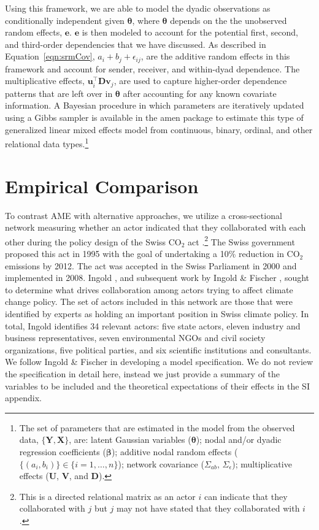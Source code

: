 \documentclass[9pt,twocolumn,twoside,lineno]{pnas-new}
\newcommand{\pkg}[1]{{\fontseries{b}\selectfont #1}}
\begin{document}
Using this framework, we are able to model the dyadic observations as conditionally independent given $\bm\theta$, where $\bm\theta$ depends on the the unobserved random effects, $\mathbf{e}$. $\mathbf{e}$ is then modeled to account for the potential first, second, and third-order dependencies that we have discussed. As described in Equation~\ref{eqn:srmCov}, $a_{i} + b_{j}  + \epsilon_{ij}$, are the additive random effects in this framework and account for sender, receiver, and within-dyad dependence. The multiplicative effects, $\textbf{u}_{i}^{\top} \textbf{D} \textbf{v}_{j}$, are used to capture higher-order dependence patterns that are left over in $\bm\theta$ after accounting for any known covariate information. A Bayesian procedure in which parameters are iteratively updated using a Gibbs sampler is available in the \pkg{amen} package to estimate this type of generalized linear mixed effects model from continuous, binary, ordinal, and other relational data types.\footnote{The set of parameters that are estimated in the model from the observed data, $\{\mathbf{Y}, \mathbf{X}\}$, are: latent Gaussian variables ($\bm\theta$); nodal and/or dyadic regression coefficients ($\bm\beta$); additive nodal random effects ($\{(a_{i},b_{i})\} \in \{i=1, \ldots, n \}$); network covariance ($\Sigma_{ab},\, \Sigma_{\epsilon}$); multiplicative effects ($\mathbf{U}$, $\mathbf{V}$, and $\mathbf{D}$).}

\section*{\textbf{Empirical Comparison}}

To contrast AME with alternative approaches, we utilize a cross-sectional network measuring whether an actor indicated that they collaborated with each other during the policy design of the Swiss CO$_{2}$ act \citep{ingold:2008}.\footnote{This is a directed relational matrix as an actor $i$ can indicate that they collaborated with $j$ but $j$ may not have stated that they collaborated with $i$.} The Swiss government proposed this act in 1995 with the goal of undertaking a 10\% reduction in CO$_{2}$ emissions by 2012. The act was accepted in the Swiss Parliament in 2000 and implemented in 2008. Ingold \cite{ingold:2008}, and subsequent work by Ingold \& Fischer \cite{ingold:fischer:2014}, sought to determine what drives collaboration among actors trying to affect climate change policy. The set of actors included in this network are those that were identified by experts as holding an important position in Swiss climate policy. In total, Ingold identifies 34 relevant actors: five state actors, eleven industry and business representatives, seven environmental NGOs and civil society organizations, five political parties, and six scientific institutions and consultants. We follow Ingold \& Fischer in developing a model specification. We do not review the specification in detail here, instead we just provide a summary of the variables to be included and the theoretical expectations of their effects in the SI appendix.
\end{document}
